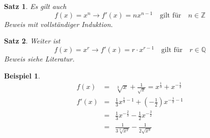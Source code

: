 \documentclass{report}
\newtheorem{myexample}{Beispiel}
\newtheorem{satz}{Satz}
\begin{document}
\begin{satz}Es gilt auch
\begin{equation}f(x) = x^n \to f'(x) = nx^{n-1} \quad \mbox{gilt für} \quad n \in \mathbb{Z}\end{equation}
Beweis mit vollständiger Induktion.\end{satz}
\begin{satz}Weiter ist
\begin{equation}f(x) = x^r \to f'(x) = r \cdot x^{r-1} \quad \mbox{gilt für} \quad r \in \mathbb{Q}\end{equation}
Beweis siehe Literatur.\end{satz}
\begin{myexample}\begin{eqnarray}f(x) & = & \sqrt[3]{x} + \frac{1}{\sqrt{x}} = x^{\frac{1}{3}} + x^{-\frac{1}{2}} \nonumber \\
f'(x) & = & \frac{1}{3}x^{\frac{1}{3}-1} + (-\frac{1}{2})x^{-\frac{1}{2}-1} \nonumber \\
& = & \frac{1}{3}x^{-\frac{2}{3}}-\frac{1}{2}x^{-\frac{3}{2}}\nonumber \\
& = & \frac{1}{3\sqrt[3]{x^2}} - \frac{1}{2\sqrt{x^3}} 
\end{eqnarray}\end{myexample}
\end{document}
